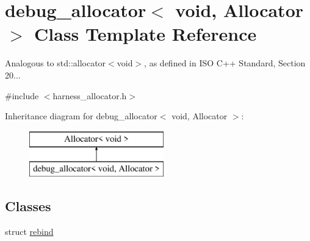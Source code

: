 \hypertarget{classdebug__allocator_3_01void_00_01Allocator_01_4}{}\section{debug\+\_\+allocator$<$ void, Allocator $>$ Class Template Reference}
\label{classdebug__allocator_3_01void_00_01Allocator_01_4}


Analogous to std\+::allocator$<$void$>$, as defined in I\+S\+O C++ Standard, Section 20...  




{\ttfamily \#include $<$harness\+\_\+allocator.\+h$>$}

Inheritance diagram for debug\+\_\+allocator$<$ void, Allocator $>$\+:\begin{figure}[H]
\begin{center}
\leavevmode
\includegraphics[height=2.000000cm]{classdebug__allocator_3_01void_00_01Allocator_01_4}
\end{center}
\end{figure}
\subsection*{Classes}
\begin{DoxyCompactItemize}
\item 
struct \hyperlink{structdebug__allocator_3_01void_00_01Allocator_01_4_1_1rebind}{rebind}
\end{DoxyCompactItemize}
